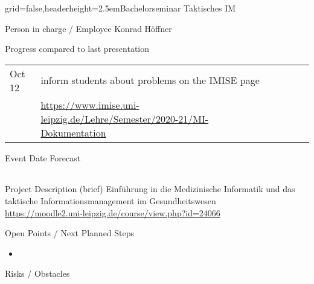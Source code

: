 \documentclass[english]{kiesgrube}
\begin{document}
\begin{poster}{grid=false,headerheight=2.5em}{}{Bachelorseminar Taktisches IM}{}{}
\begin{posterbox}[name=person,column=0,row=0]{Person in charge / Employee}
Konrad Höffner
\end{posterbox}
\begin{posterbox}[name=progress,below=person,span=2]{Progress compared to last presentation}
\footnotesize
\begin{tabulary}{\textwidth}{lllllL}
Oct 12	&inform students about problems on the IMISE page\\
		&\url{https://www.imise.uni-leipzig.de/Lehre/Semester/2020-21/MI-Dokumentation}\\
\end{tabulary}
\end{posterbox}
\begin{posterbox}[name=event,below=progress,span=2]{Event Date Forecast}
\footnotesize
\begin{tabulary}{\textwidth}{lllllL}
\end{tabulary}
\end{posterbox}
\begin{posterbox}[name=description,column=1,row=0]{Project Description (brief)}
Einführung in die Medizinische Informatik und das taktische Informationsmanagement im Gesundheitswesen\\
\url{https://moodle2.uni-leipzig.de/course/view.php?id=24066}
\end{posterbox}
\begin{posterbox}[name=open,column=0,below=event]{Open Points / Next Planned Steps}
\small
\begin{itemize}
\item 
\end{itemize}
\end{posterbox}
\begin{posterbox}[name=risks,column=1,below=event]{Risks / Obstacles}

\end{posterbox}
\end{poster}
\end{document}
